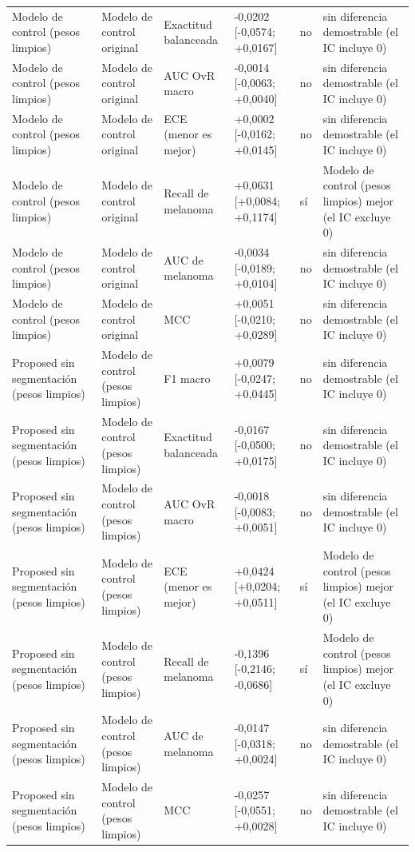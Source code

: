 \begin{longtable}{@{}llllll@{}}
Modelo de control (pesos limpios) & Modelo de control original & Exactitud balanceada & -0,0202 [-0,0574; +0,0167] & no & sin diferencia demostrable (el IC incluye 0) \\
Modelo de control (pesos limpios) & Modelo de control original & AUC OvR macro & -0,0014 [-0,0063; +0,0040] & no & sin diferencia demostrable (el IC incluye 0) \\
Modelo de control (pesos limpios) & Modelo de control original & ECE (menor es mejor) & +0,0002 [-0,0162; +0,0145] & no & sin diferencia demostrable (el IC incluye 0) \\
Modelo de control (pesos limpios) & Modelo de control original & Recall de melanoma & +0,0631 [+0,0084; +0,1174] & sí & Modelo de control (pesos limpios) mejor (el IC excluye 0) \\
Modelo de control (pesos limpios) & Modelo de control original & AUC de melanoma & -0,0034 [-0,0189; +0,0104] & no & sin diferencia demostrable (el IC incluye 0) \\
Modelo de control (pesos limpios) & Modelo de control original & MCC & +0,0051 [-0,0210; +0,0289] & no & sin diferencia demostrable (el IC incluye 0) \\
Proposed sin segmentación (pesos limpios) & Modelo de control (pesos limpios) & F1 macro & +0,0079 [-0,0247; +0,0445] & no & sin diferencia demostrable (el IC incluye 0) \\
Proposed sin segmentación (pesos limpios) & Modelo de control (pesos limpios) & Exactitud balanceada & -0,0167 [-0,0500; +0,0175] & no & sin diferencia demostrable (el IC incluye 0) \\
Proposed sin segmentación (pesos limpios) & Modelo de control (pesos limpios) & AUC OvR macro & -0,0018 [-0,0083; +0,0051] & no & sin diferencia demostrable (el IC incluye 0) \\
Proposed sin segmentación (pesos limpios) & Modelo de control (pesos limpios) & ECE (menor es mejor) & +0,0424 [+0,0204; +0,0511] & sí & Modelo de control (pesos limpios) mejor (el IC excluye 0) \\
Proposed sin segmentación (pesos limpios) & Modelo de control (pesos limpios) & Recall de melanoma & -0,1396 [-0,2146; -0,0686] & sí & Modelo de control (pesos limpios) mejor (el IC excluye 0) \\
Proposed sin segmentación (pesos limpios) & Modelo de control (pesos limpios) & AUC de melanoma & -0,0147 [-0,0318; +0,0024] & no & sin diferencia demostrable (el IC incluye 0) \\
Proposed sin segmentación (pesos limpios) & Modelo de control (pesos limpios) & MCC & -0,0257 [-0,0551; +0,0028] & no & sin diferencia demostrable (el IC incluye 0) \\
\bottomrule
\end{longtable}
\endgroup

